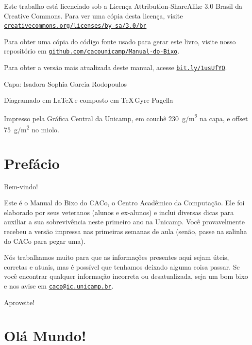\documentclass[a4paper,10pt,oldfontcommands]{memoir}
\newcommand{\email}[1]{\href{mailto:#1}{\nolinkurl{#1}}}
\renewcommand{\url}[1]{\href{http://#1}{\nolinkurl{#1}}}
\begin{document}
\begin{center}
Este trabalho está licenciado sob a Licença Attribution-ShareAlike 3.0 Brasil da
Creative Commons. Para ver uma cópia desta licença, visite
\url{creativecommons.org/licenses/by-sa/3.0/br}

Para obter uma cópia do código fonte usado para gerar este livro, visite nosso
repositório em \url{github.com/cacounicamp/Manual-do-Bixo}.

Para obter a versão mais atualizada deste manual, acesse \url{bit.ly/1usUfYO}.

Capa: Isadora Sophia Garcia Rodopoulos

\setlength{\parskip}{0em}
\vfill

Diagramado em \LaTeX\,e composto em \TeX\,Gyre Pagella

Impresso pela Gráfica Central da Unicamp, em couchê \SI{230}{g/m^2} na capa, e offset
\SI{75}{g/m^2} no miolo.

\end{center}
\cleardoublepage
\pagestyle{plain}
\tableofcontents

\chapter{Prefácio}
\setlength{\parskip}{1em}

Bem-vindo!

Este é o Manual do Bixo do CACo, o Centro Acadêmico da Computação. Ele foi
elaborado por seus veteranos (alunos e ex-alunos) e inclui diversas dicas para
auxiliar a sua sobrevivência neste primeiro ano na Unicamp. Você provavelmente
recebeu a versão impressa nas primeiras semanas de aula (senão, passe na salinha
do CACo para pegar uma).

Nós trabalhamos muito para que as informações presentes aqui sejam úteis,
corretas e atuais, mas é possível que tenhamos deixado alguma coisa passar. Se
você encontrar qualquer informação incorreta ou desatualizada, seja um bom bixo
e nos avise em \email{caco@ic.unicamp.br}.

Aproveite!

\setlength{\parskip}{0em}
\mainmatter
\pagestyle{headings}
\twocolumn
\chapter{Olá Mundo!}


\clearpage


\clearpage
\end{document}
